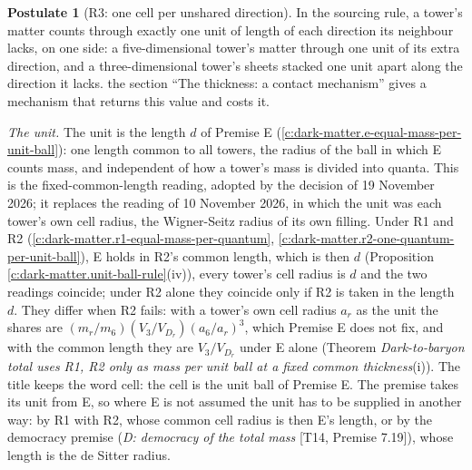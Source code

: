 \documentclass[11pt]{article}
\theoremstyle{definition}
\newtheorem{postulate}[theorem]{Postulate}
\theoremstyle{plain}
\begin{document}
\begin{postulate}[R3: one cell per unshared direction]\label{c:dark-matter.r3-one-cell-per-unshared-direction}
In the sourcing rule, a tower's matter counts through exactly one unit of length of each direction its neighbour lacks, on one side: a five-dimensional tower's matter through one unit of its extra direction, and a three-dimensional tower's sheets stacked one unit apart along the direction it lacks. the section ``The thickness: a contact mechanism'' gives a mechanism that returns this value and costs it.

\emph{The unit.} The unit is the length $d$ of Premise E (\ref{c:dark-matter.e-equal-mass-per-unit-ball}): one length common to all towers, the radius of the ball in which E counts mass, and independent of how a tower's mass is divided into quanta. This is the fixed-common-length reading, adopted by the decision of 19 November 2026; it replaces the reading of 10 November 2026, in which the unit was each tower's own cell radius, the Wigner-Seitz radius of its own filling. Under R1 and R2 (\ref{c:dark-matter.r1-equal-mass-per-quantum}, \ref{c:dark-matter.r2-one-quantum-per-unit-ball}), E holds in R2's common length, which is then $d$ (Proposition \ref{c:dark-matter.unit-ball-rule}(iv)), every tower's cell radius is $d$ and the two readings coincide; under R2 alone they coincide only if R2 is taken in the length $d$. They differ when R2 fails: with a tower's own cell radius $a_{r}$ as the unit the shares are $(m_{r}/m_{6})(V_{3}/V_{D_{r}})(a_{6}/a_{r})^{3}$, which Premise E does not fix, and with the common length they are $V_{3}/V_{D_{r}}$ under E alone (Theorem \emph{Dark-to-baryon total uses R1, R2 only as mass per unit ball at a fixed common thickness}(i)). The title keeps the word cell: the cell is the unit ball of Premise E. The premise takes its unit from E, so where E is not assumed the unit has to be supplied in another way: by R1 with R2, whose common cell radius is then E's length, or by the democracy premise (\emph{D: democracy of the total mass} [T14, Premise 7.19]), whose length is the de Sitter radius.
\end{postulate}
\end{document}
